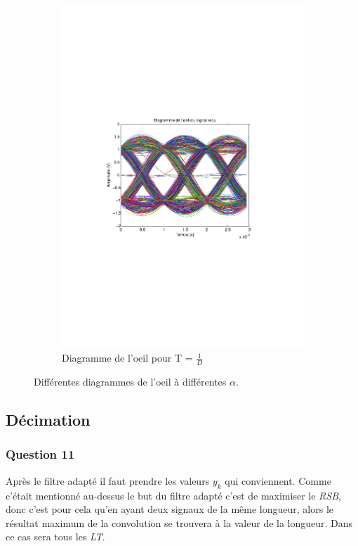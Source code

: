 \documentclass[a4paper,11pt]{article}
\begin{document}
\begin{figure}
\begin{subfigure}{.5\textwidth}
  		\includegraphics[width=1\linewidth]{Q10-EbNo20.pdf}
  		\caption{Diagramme de l'oeil pour T = $\frac{1}{D}$}
  		\label{fig:q10t1}
	\end{subfigure}
	\caption{Différentes diagrammes de l'oeil à différentes $\alpha$.}
	\label{fig:q10t}
\end{figure} 



\subsection{Décimation}
\subsubsection*{Question 11}
Après le filtre adapté il faut prendre les valeurs $y_k$ qui conviennent. Comme c'était mentionné au-dessus le but du filtre adapté c'est de maximiser le \emph{RSB}, donc c'est pour cela qu'en ayant deux signaux de la même longueur, alors le résultat maximum de la convolution se trouvera à la valeur de la longueur. Dans ce cas sera tous les \emph{LT}. 
\end{document}
